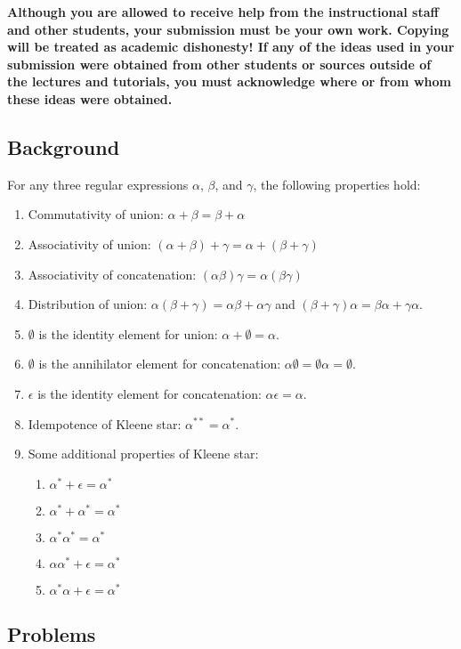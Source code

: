 \documentclass[11pt,fleqn]{article}
\newcommand{\be}{\begin{enumerate}}
\newcommand{\ee}{\end{enumerate}}
\begin{document}
	\textbf{Although you are allowed to receive help from the
		instructional staff and other students, your submission must be your
		own work.  Copying will be treated as academic dishonesty! If any of
		the ideas used in your submission were obtained from other students
		or sources outside of the lectures and tutorials, you must
		acknowledge where or from whom these ideas were obtained.}
	
	\newpage
	
	\subsection*{Background}
	For any three regular expressions $\alpha$, $\beta$, and $\gamma$, the following properties hold:
	\be
	\item Commutativity of union: $ \alpha + \beta  = \beta + \alpha$
	\item Associativity of union: $ (\alpha + \beta) + \gamma = \alpha + (\beta + \gamma)$
	\item Associativity of concatenation: $(\alpha \beta) \gamma = \alpha (\beta  \gamma)$
	\item Distribution of union: $ \alpha (\beta + \gamma) = \alpha \beta + \alpha  \gamma$ and $  (\beta + \gamma)\alpha =  \beta \alpha +   \gamma \alpha$.
	\item $\emptyset$ is the identity element for union: $\alpha + \emptyset = \alpha$.
	\item $\emptyset$ is the annihilator element for concatenation: $\alpha  \emptyset = \emptyset \alpha = \emptyset$.
	\item $\epsilon$ is the identity element for concatenation: $\alpha  \epsilon = \alpha$.
	\item Idempotence of Kleene star: $\alpha^{**} = \alpha^*$.
	\item Some additional properties of Kleene star:
		\be
			\item $\alpha^* + \epsilon = \alpha^*$
			\item $\alpha^* + \alpha^* = \alpha^*$
			\item $\alpha^*\alpha^* = \alpha^*$
			\item $\alpha\alpha^* + \epsilon = \alpha^*$
			\item $\alpha^*\alpha + \epsilon = \alpha^*$
		\ee
	\ee
	
	\subsection*{Problems}
	
\end{document}
